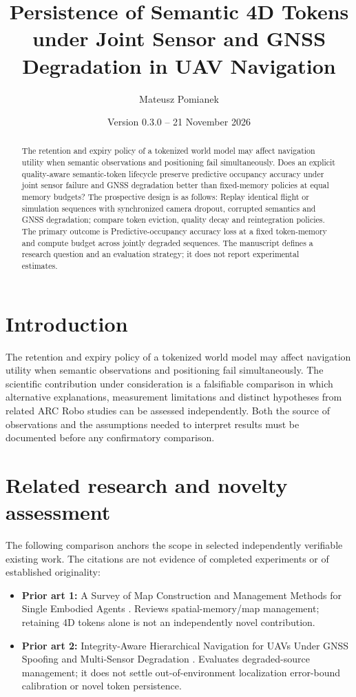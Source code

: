 \documentclass[11pt,a4paper]{article}
\title{Persistence of Semantic 4D Tokens under Joint Sensor and GNSS Degradation in UAV Navigation}
\author{Mateusz Pomianek}
\date{Version 0.3.0 -- 21 November 2026}
\begin{document}
\maketitle

\begin{abstract}
The retention and expiry policy of a tokenized world model may affect navigation utility when semantic observations and positioning fail simultaneously. Does an explicit quality-aware semantic-token lifecycle preserve predictive occupancy accuracy under joint sensor failure and GNSS degradation better than fixed-memory policies at equal memory budgets? The prospective design is as follows: Replay identical flight or simulation sequences with synchronized camera dropout, corrupted semantics and GNSS degradation; compare token eviction, quality decay and reintegration policies. The primary outcome is Predictive-occupancy accuracy loss at a fixed token-memory and compute budget across jointly degraded sequences. The manuscript defines a research question and an evaluation strategy; it does not report experimental estimates.
\end{abstract}

\section{Introduction}
The retention and expiry policy of a tokenized world model may affect navigation utility when semantic observations and positioning fail simultaneously. The scientific contribution under consideration is a falsifiable comparison in which alternative explanations, measurement limitations and distinct hypotheses from related ARC Robo studies can be assessed independently. Both the source of observations and the assumptions needed to interpret results must be documented before any confirmatory comparison.

\section{Related research and novelty assessment}
The following comparison anchors the scope in selected independently verifiable existing work. The citations are not evidence of completed experiments or of established originality:
\begin{itemize}
\item \textbf{Prior art 1:} A Survey of Map Construction and Management Methods for Single Embodied Agents \cite{source1}. Reviews spatial-memory/map management; retaining 4D tokens alone is not an independently novel contribution.
\item \textbf{Prior art 2:} Integrity-Aware Hierarchical Navigation for UAVs Under GNSS Spoofing and Multi-Sensor Degradation \cite{source2}. Evaluates degraded-source management; it does not settle out-of-environment localization error-bound calibration or novel token persistence.
\end{itemize}
\end{document}
